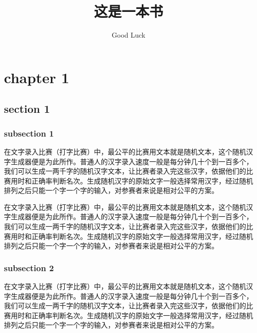 \documentclass[12pt,hyperref,UTF8]{ctexbook}
\title{这是一本书}                              %
\author{Good Luck}                              %
\begin{document}
\pagestyle{empty}                 %
\maketitle                        %

\cleardoublepage
\pagestyle{headings}              %
\tableofcontents                  %

\cleardoublepage
%
%
\chapter{chapter 1}
\section{section 1}

\subsection{subsection 1}

在文字录入比赛（打字比赛）中，最公平的比赛用文本就是随机文本，这个随机汉字生成器便是为此所作。普通人的汉字录入速度一般是每分钟几十个到一百多个，我们可以生成一两千字的随机汉字文本，让比赛者录入完这些汉字，依据他们的比赛用时和正确率判断名次。生成随机汉字的原始文字一般选择常用汉字，经过随机排列之后只能一个字一个字的输入，对参赛者来说是相对公平的方案。

在文字录入比赛（打字比赛）中，最公平的比赛用文本就是随机文本，这个随机汉字生成器便是为此所作。普通人的汉字录入速度一般是每分钟几十个到一百多个，我们可以生成一两千字的随机汉字文本，让比赛者录入完这些汉字，依据他们的比赛用时和正确率判断名次。生成随机汉字的原始文字一般选择常用汉字，经过随机排列之后只能一个字一个字的输入，对参赛者来说是相对公平的方案。

\subsection{subsection 2}

在文字录入比赛（打字比赛）中，最公平的比赛用文本就是随机文本，这个随机汉字生成器便是为此所作。普通人的汉字录入速度一般是每分钟几十个到一百多个，我们可以生成一两千字的随机汉字文本，让比赛者录入完这些汉字，依据他们的比赛用时和正确率判断名次。生成随机汉字的原始文字一般选择常用汉字，经过随机排列之后只能一个字一个字的输入，对参赛者来说是相对公平的方案。
\end{document}
